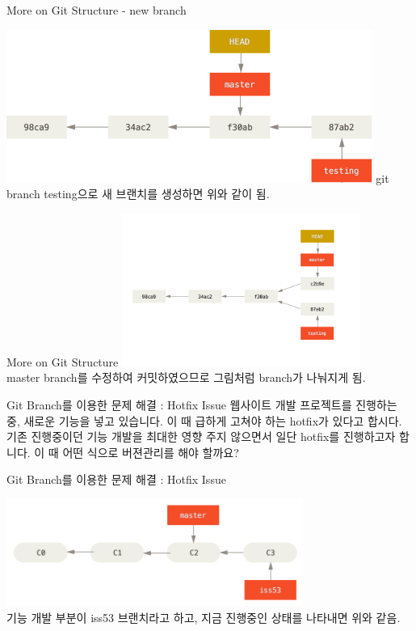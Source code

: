 \documentclass{beamer}
\begin{document}
\begin{frame}{More on Git Structure - new branch} 

\includegraphics[height=5cm,keepaspectratio]{checkout-master}
git branch testing으로 새 브랜치를 생성하면 위와 같이 됨. 
\end{frame}


\begin{frame}{More on Git Structure} 
\includegraphics[height=5cm,keepaspectratio]{advance-master} \\
master branch를 수정하여 커밋하였으므로 그림처럼 branch가 나눠지게 됨. 
\end{frame}


\begin{frame}{Git Branch를 이용한 문제 해결 : Hotfix Issue}
웹사이트 개발 프로젝트를 진행하는 중, 새로운 기능을 넣고 있습니다. 이 때 급하게 고쳐야 하는 hotfix가 있다고 합시다. 기존 진행중이던 기능 개발을 최대한 영향 주지 않으면서 일단 hotfix를 진행하고자 합니다. 이 때 어떤 식으로 버젼관리를 해야 할까요?  
\end{frame}

\begin{frame}{Git Branch를 이용한 문제 해결 : Hotfix Issue} 

\includegraphics[height=3.5cm,keepaspectratio]{develop}  \\
기능 개발 부분이 iss53 브랜치라고 하고, 지금 진행중인 상태를 나타내면 위와 같음. 
\end{frame}
\end{document}
